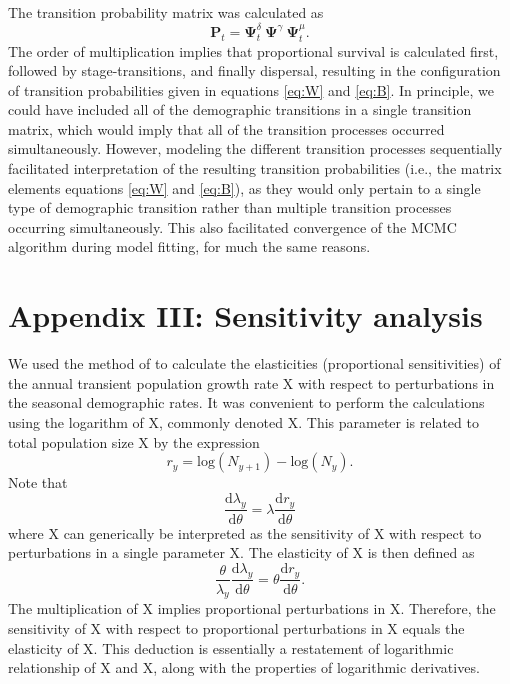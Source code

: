 \documentclass[11pt]{article}
\begin{document}
The transition probability matrix was calculated as
\begin{equation} \label{eq:POmega}
\mathbf{P}_{t} = \boldsymbol\Psi^{\delta}_t~\boldsymbol\Psi^{\gamma}~\boldsymbol\Psi^{\mu}_t.
\end{equation}
%
The order of multiplication implies that proportional survival is calculated first,
followed by stage-transitions, and finally dispersal,
resulting in the configuration of transition probabilities
given in equations \ref{eq:W} and \ref{eq:B}.
In principle, we could have included all of the demographic transitions in a single
transition matrix,
which would imply that all of the transition processes occurred simultaneously.
However, modeling the different transition processes sequentially facilitated interpretation
of the resulting transition probabilities
(i.e., the matrix elements equations \ref{eq:W} and \ref{eq:B}),
as they would only pertain to a single type of demographic transition
rather than multiple transition processes occurring simultaneously.
This also facilitated convergence of the MCMC algorithm during model fitting,
for much the same reasons.




\section*{Appendix III: Sensitivity analysis}

We used the method of \cite{caswell2007sensitivity} to calculate the elasticities
(proportional sensitivities) of the annual transient population growth rate X
with respect to perturbations in the seasonal demographic rates.
It was convenient to perform the calculations using the logarithm of X,
commonly denoted X.
This parameter is related to total population size X by the expression
%
\begin{equation} \label{eq:r}
r_y = \text{log}\left(N_{y+1}\right) - \text{log}\left({N_y}\right).
\end{equation}
%
Note that
%
\begin{equation} \label{eq:lsens}
\frac{\text{d}\lambda_y}{\text{d}\theta} = \lambda \frac{\text{d}r_y}{\text{d}\theta}
\end{equation}
%
where X can generically be interpreted
as the sensitivity of X with respect to perturbations
in a single parameter X.
The elasticity of X is then defined as
%
\begin{equation} \label{eq:lelas}
\frac{\theta}{\lambda_y} \frac{\text{d}\lambda_y}{\text{d}\theta} =
        \theta\frac{\text{d}r_y}{\text{d}\theta}.
\end{equation}
%
The multiplication of X
implies proportional perturbations in X.
Therefore, the sensitivity of X with respect to proportional perturbations in X
equals the elasticity of X.
This deduction is essentially a restatement of logarithmic relationship of X
and X, along with the properties of logarithmic derivatives.
\end{document}
